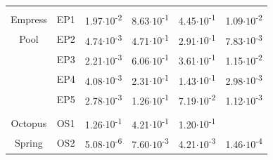 \begin{table}
\begin{adjustbox}{width=\textwidth,keepaspectratio}
\begin{threeparttable}
\begin{tabular}{clllcc}
      &       &       &       &       &  \\
Empress & EP1   & 1.97$\cdot 10$\textsuperscript{-2} & 8.63$\cdot 10$\textsuperscript{-1} & 4.45$\cdot 10$\textsuperscript{-1} & 1.09$\cdot 10$\textsuperscript{-2} \\
Pool  & EP2   & 4.74$\cdot 10$\textsuperscript{-3} & 4.71$\cdot 10$\textsuperscript{-1} & 2.91$\cdot 10$\textsuperscript{-1} & 7.83$\cdot 10$\textsuperscript{-3} \\
      & EP3   & 2.21$\cdot 10$\textsuperscript{-3} & 6.06$\cdot 10$\textsuperscript{-1} & 3.61$\cdot 10$\textsuperscript{-1} & 1.15$\cdot 10$\textsuperscript{-2} \\
      & EP4   & 4.08$\cdot 10$\textsuperscript{-3} & 2.31$\cdot 10$\textsuperscript{-1} & 1.43$\cdot 10$\textsuperscript{-1} & 2.98$\cdot 10$\textsuperscript{-3} \\
      & EP5   & 2.78$\cdot 10$\textsuperscript{-3} & 1.26$\cdot 10$\textsuperscript{-1} & 7.19$\cdot 10$\textsuperscript{-2} & 1.12$\cdot 10$\textsuperscript{-3} \\
      &       &       &       &       &  \\
Octopus & OS1   & 1.26$\cdot 10$\textsuperscript{-1} & 4.21$\cdot 10$\textsuperscript{-1} & 1.20$\cdot 10$\textsuperscript{-1} &  \\
Spring & OS2   & 5.08$\cdot 10$\textsuperscript{-6} & 7.60$\cdot 10$\textsuperscript{-3} & 4.21$\cdot 10$\textsuperscript{-3} & 1.46$\cdot 10$\textsuperscript{-4} \\
\bottomrule
\end{tabular}%




  
  \begin{tablenotes}
    

        
  \end{tablenotes}
  
  \label{tab:leftover_props}
  \end{threeparttable}
  \end{adjustbox}
\end{table}
\setcounter{tabcounter}{0} %
\doublespace





